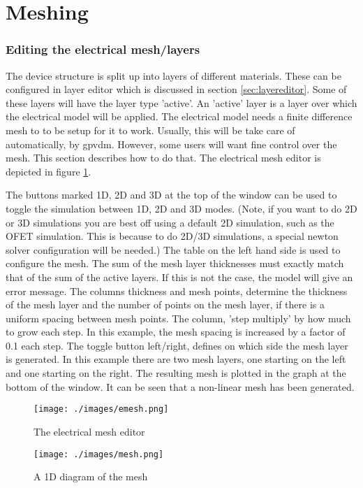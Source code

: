 \newpage
\section{Meshing}
\label{ref:mesh}
\subsubsection{Editing the electrical mesh/layers}
The device structure is split up into layers of different materials.  These can be configured in layer editor which is discussed in section \ref{sec:layereditor}.  Some of these layers will have the layer type 'active'.  An 'active' layer is a layer over which the electrical model will be applied.  The electrical model needs a finite difference mesh to to be setup for it to work.  Usually, this will be take care of automatically, by gpvdm.  However, some users will want fine control over the mesh.  This section describes how to do that. The electrical mesh editor is depicted in figure \ref{fig:emesh}.

The buttons marked 1D, 2D and 3D at the top of the window can be used to toggle the simulation between 1D, 2D and 3D modes.  (Note, if you want to do 2D or 3D simulations you are best off using a default 2D simulation, such as the OFET simulation.  This is because to do 2D/3D simulations, a special newton solver configuration will be needed.) The table on the left hand side is used to configure the mesh.  The sum of the mesh layer thicknesses must exactly match that of the sum of the active layers.  If this is not the case, the model will give an error message.  The columns thickness and mesh points, determine the thickness of the mesh layer and the number of points on the mesh layer, if there is a uniform spacing between mesh points.  The column, 'step multiply' by how much to grow each step.  In this example, the mesh spacing is increased by a factor of 0.1 each step.  The toggle button left/right, defines on which side the mesh layer is generated.  In this example there are two mesh layers, one starting on the left and one starting on the right.  The resulting mesh is plotted in the graph at the bottom of the window.  It can be seen that a non-linear mesh has been generated.

\begin{figure}[H]
\centering
\texttt{[image: ./images/emesh.png]}
\caption{The electrical mesh editor}
\label{fig:emesh}
\end{figure}

\begin{figure}[H]
\centering
\texttt{[image: ./images/mesh.png]}
\caption{A 1D diagram of the mesh}
\label{fig:emeshdiagram}
\end{figure}

